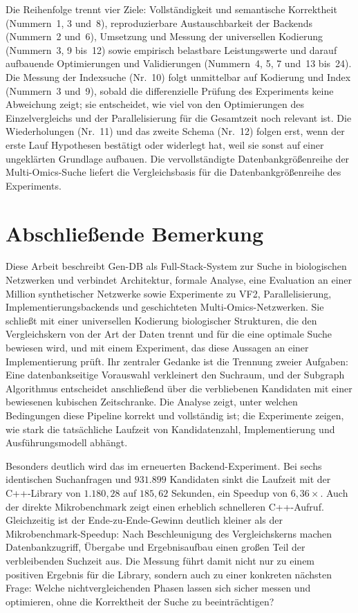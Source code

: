 \documentclass[a4paper,12pt, twoside]{report}
\theoremstyle{definition}
\begin{document}
Die Reihenfolge trennt vier Ziele: Vollständigkeit und semantische Korrektheit (Nummern~1, 3 und~8), reproduzierbare Austauschbarkeit der Backends (Nummern~2 und~6), Umsetzung und Messung der universellen Kodierung (Nummern~3, 9 bis~12) sowie empirisch belastbare Leistungswerte und darauf aufbauende Optimierungen und Validierungen (Nummern~4, 5, 7 und~13 bis~24). Die Messung der Indexsuche (Nr.~10) folgt unmittelbar auf Kodierung und Index (Nummern~3 und~9), sobald die differenzielle Prüfung des Experiments keine Abweichung zeigt; sie entscheidet, wie viel von den Optimierungen des Einzelvergleichs und der Parallelisierung für die Gesamtzeit noch relevant ist. Die Wiederholungen (Nr.~11) und das zweite Schema (Nr.~12) folgen erst, wenn der erste Lauf Hypothesen bestätigt oder widerlegt hat, weil sie sonst auf einer ungeklärten Grundlage aufbauen. Die vervollständigte Datenbankgrößenreihe der Multi-Omics-Suche liefert die Vergleichsbasis für die Datenbankgrößenreihe des Experiments.

\section{Abschließende Bemerkung}
\label{sec:schlussbemerkung}

Diese Arbeit beschreibt Gen-DB als Full-Stack-System zur Suche in biologischen Netzwerken und verbindet Architektur, formale Analyse, eine Evaluation an einer Million synthetischer Netzwerke sowie Experimente zu VF2, Parallelisierung, Implementierungsbackends und geschichteten Multi-Omics-Netzwerken. Sie schließt mit einer universellen Kodierung biologischer Strukturen, die den Vergleichskern von der Art der Daten trennt und für die eine optimale Suche bewiesen wird, und mit einem Experiment, das diese Aussagen an einer Implementierung prüft. Ihr zentraler Gedanke ist die Trennung zweier Aufgaben: Eine datenbankseitige Vorauswahl verkleinert den Suchraum, und der Subgraph Algorithmus entscheidet anschließend über die verbliebenen Kandidaten mit einer bewiesenen kubischen Zeitschranke. Die Analyse zeigt, unter welchen Bedingungen diese Pipeline korrekt und vollständig ist; die Experimente zeigen, wie stark die tatsächliche Laufzeit von Kandidatenzahl, Implementierung und Ausführungsmodell abhängt.

Besonders deutlich wird das im erneuerten Backend-Experiment. Bei sechs identischen Suchanfragen und $931.899$ Kandidaten sinkt die Laufzeit mit der C++-Library von $1.180{,}28$ auf $185{,}62$ Sekunden, ein Speedup von $6{,}36\times$. Auch der direkte Mikrobenchmark zeigt einen erheblich schnelleren C++-Aufruf. Gleichzeitig ist der Ende-zu-Ende-Gewinn deutlich kleiner als der Mikrobenchmark-Speedup: Nach Beschleunigung des Vergleichskerns machen Datenbankzugriff, Übergabe und Ergebnisaufbau einen großen Teil der verbleibenden Suchzeit aus. Die Messung führt damit nicht nur zu einem positiven Ergebnis für die Library, sondern auch zu einer konkreten nächsten Frage: Welche nichtvergleichenden Phasen lassen sich sicher messen und optimieren, ohne die Korrektheit der Suche zu beeinträchtigen?
\end{document}
